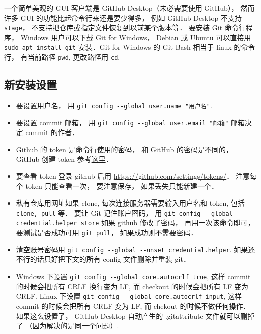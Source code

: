

一个简单美观的 GUI 客户端是 GitHub Desktop（未必需要使用 GitHub）， 然而许多 GUI 的功能比起命令行来还是要少得多， 例如 GitHub Desktop 不支持 \verb|stage|， 不支持把仓库或指定文件恢复到以前某个版本等． 要安装 Git 命令行程序， Windows 用户可以下载 \href{https://gitforwindows.org/}{Git for Windows}， Debian 或 Ubuntu 可以直接用 \verb|sudo apt install git| 安装．Git for Windows 的 Git Bash 相当于 linux 的命令行， 有当前路径 \verb|pwd|, 更改路径用 \verb|cd|.

\subsection{新安装设置}
\begin{itemize}
\item 要设置用户名， 用 \verb|git config --global user.name "用户名"|.
\item 要设置 commit 邮箱， 用 \verb|git config --global user.email "邮箱"|  邮箱决定 commit 的作者．
\item Github 的 token 是命令行使用的密码， 和 GitHub 的密码是不同的， GitHub 创建 token 参考\href{https://docs.github.com/en/github/authenticating-to-github/keeping-your-account-and-data-secure/creating-a-personal-access-token#creating-a-token}{这里}．
\item 要查看 token 登录 github 后用 \href{https://github.com/settings/tokens/}{https://github.com/settings/tokens/}． 注意每个 token 只能查看一次， 要注意保存， 如果丢失只能新建一个．
\item 私有仓库用网址如果 clone, 每次连接服务器需要输入用户名和 token, 包括 \verb|clone, pull| 等． 要让 Git 记住账户密码， 用 \verb|git config --global credential.helper store| 如果 github 修改了密码， 再用一次该命令即可， 要测试是否成功可用 \verb|git pull|， 如果成功则不需要密码．
\item 清空账号密码用 \verb|git config --global --unset credential.helper|. 如果还不行的话只好把下文的所有 config 文件删除并重装 git．
\item Windows 下设置 \verb|git config --global core.autocrlf true|, 这样 commit 的时候会把所有 CRLF 换行变为 LF, 而 checkout 的时候会把所有 LF 变为 CRLF. Linux 下设置 \verb|git config --global core.autocrlf input|, 这样 commit 的时候会把所有 CRLF 变为 LF, 而 chekout 的时候不做任何操作． 如果这么设置了， GitHub Desktop 自动产生的 .gitattribute 文件就可以删掉了 （因为解决的是同一个问题）.

\end{itemize}
